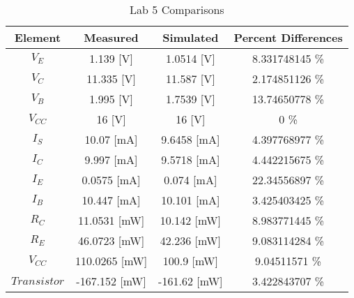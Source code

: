 \documentclass{article}
\begin{document}
\begin{table}[h]
\begin{center}
\label{code:resis}
\caption{Lab 5 Comparisons}
\begin{tabular}{c|c|c|c}
Element	&Measured&Simulated& Percent Differences 
\\\hline
$V_E$	&	1.139	[V] &	1.0514	[V] &	8.331748145	\% \\
$V_C$	&	11.335	[V] &	11.587	[V] &	2.174851126	\% \\
$V_B$	&	1.995	[V] &	1.7539	[V] &	13.74650778	\% \\
$V_{CC}$	&	16	[V] &	16	[V] &	0	\% \\
$I_S$	&	10.07	[mA] &	9.6458	[mA] &	4.397768977	\% \\
$I_C$	&	9.997	[mA] &	9.5718	[mA] &	4.442215675	\% \\
$I_E$	&	0.0575	[mA] &	0.074	[mA] &	22.34556897	\% \\
$I_B$	&	10.447	[mA] &	10.101	[mA] &	3.425403425	\% \\
$R_C$	&	11.0531	[mW] &	10.142	[mW] &	8.983771445	\% \\
$R_E$	&	46.0723	[mW] &	42.236	[mW] &	9.083114284	\% \\
$V_{CC}$	&	110.0265	[mW] &	100.9	[mW] &	9.04511571	\% \\
$Transistor$	&	-167.152	[mW] &	-161.62	[mW] &	3.422843707	\% \\



\end{tabular}
\end{center}

\end{table}
\end{document}
